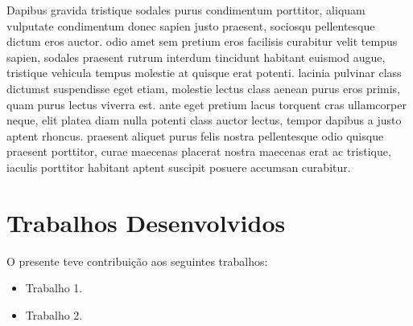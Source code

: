 Dapibus gravida tristique sodales purus condimentum porttitor, aliquam vulputate condimentum donec sapien justo praesent, sociosqu pellentesque dictum eros auctor. odio amet sem pretium eros facilisis curabitur velit tempus sapien, sodales praesent rutrum interdum tincidunt habitant euismod augue, tristique vehicula tempus molestie at quisque erat potenti. lacinia pulvinar class dictumst suspendisse eget etiam, molestie lectus class aenean purus eros primis, quam purus lectus viverra est. ante eget pretium lacus torquent cras ullamcorper neque, elit platea diam nulla potenti class auctor lectus, tempor dapibus a justo aptent rhoncus. praesent aliquet purus felis nostra pellentesque odio quisque praesent porttitor, curae maecenas placerat nostra maecenas erat ac tristique, iaculis porttitor habitant aptent suscipit posuere accumsan curabitur.

\section{Trabalhos Desenvolvidos}

O presente \imprimirtipotrabalho teve contribuição aos seguintes trabalhos:

\begin{itemize}
    \item Trabalho 1.
    \item Trabalho 2.
\end{itemize}

